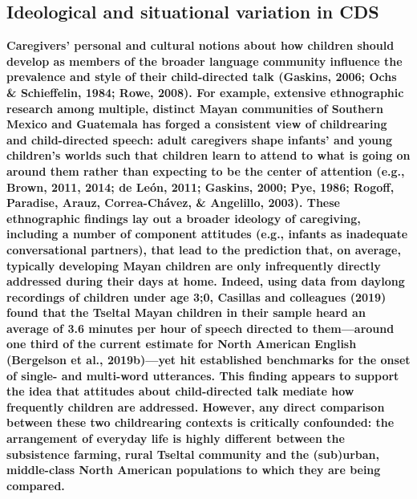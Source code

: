\documentclass[,man,floatsintext]{apa6}
\begin{document}
\subsection{Ideological and situational variation in
CDS}\label{ideological-and-situational-variation-in-cds}

\textbf{Caregivers' personal and cultural notions about how children
should develop as members of the broader language community influence
the prevalence and style of their child-directed talk (Gaskins, 2006;
Ochs \& Schieffelin, 1984; Rowe, 2008). For example, extensive
ethnographic research among multiple, distinct Mayan communities of
Southern Mexico and Guatemala has forged a consistent view of
childrearing and child-directed speech: adult caregivers shape infants'
and young children's worlds such that children learn to attend to what
is going on around them rather than expecting to be the center of
attention (e.g., Brown, 2011, 2014; de León, 2011; Gaskins, 2000; Pye,
1986; Rogoff, Paradise, Arauz, Correa-Chávez, \& Angelillo, 2003). These
ethnographic findings lay out a broader ideology of caregiving,
including a number of component attitudes (e.g., infants as inadequate
conversational partners), that lead to the prediction that, on average,
typically developing Mayan children are only infrequently directly
addressed during their days at home. Indeed, using data from daylong
recordings of children under age 3;0, Casillas and colleagues (2019)
found that the Tseltal Mayan children in their sample heard an average
of 3.6 minutes per hour of speech directed to them---around one third of
the current estimate for North American English (Bergelson et al.,
2019b)---yet hit established benchmarks for the onset of single- and
multi-word utterances. This finding appears to support the idea that
attitudes about child-directed talk mediate how frequently children are
addressed. However, any direct comparison between these two childrearing
contexts is critically confounded: the arrangement of everyday life is
highly different between the subsistence farming, rural Tseltal
community and the (sub)urban, middle-class North American populations to
which they are being compared.}
\end{document}
